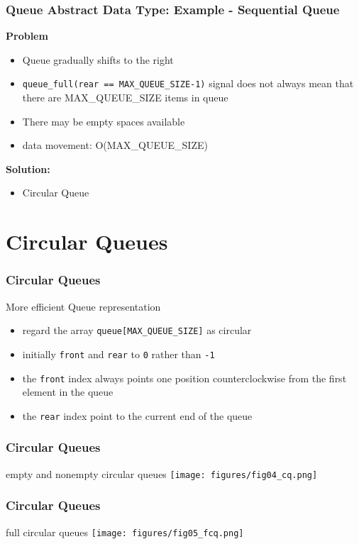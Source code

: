 \documentclass[newPxFont,sthlmFooter,nooffset]{beamer}
\begin{document}
\begin{frame}[t, fragile]
  \frametitle{Queue Abstract Data Type: Example - Sequential Queue}
\textbf{Problem}
\begin{itemize}
\item Queue gradually shifts to the right
\item \texttt{queue\_full(rear == MAX\_QUEUE\_SIZE-1)} signal does not
  always mean that there are MAX\_QUEUE\_SIZE items in queue
\item There may be empty spaces available
\item data movement: O(MAX\_QUEUE\_SIZE)
\end{itemize}
\bigskip
\textbf{Solution:}
  \begin{itemize}
  \item<2-> Circular Queue
  \end{itemize}
\end{frame}


\section{Circular Queues} 
\begin{frame}[t]
  \frametitle{Circular Queues}
More efficient Queue representation
\begin{itemize}
\item  regard the array \texttt{queue[MAX\_QUEUE\_SIZE]} as circular
\item initially \texttt{front} and \texttt{rear} to \texttt{0} rather than \texttt{-1}
\item the \texttt{front} index always points one position counterclockwise from the first element in the queue
\item the \texttt{rear} index point to the current end of the queue
\end{itemize}
\end{frame}

\begin{frame}[t]
  \frametitle{Circular Queues}
empty and nonempty circular queues
\texttt{[image: figures/fig04\_cq.png]}
\end{frame}

\begin{frame}[t]
  \frametitle{Circular Queues}
full circular queues
\texttt{[image: figures/fig05\_fcq.png]}
\end{frame}
\end{document}
